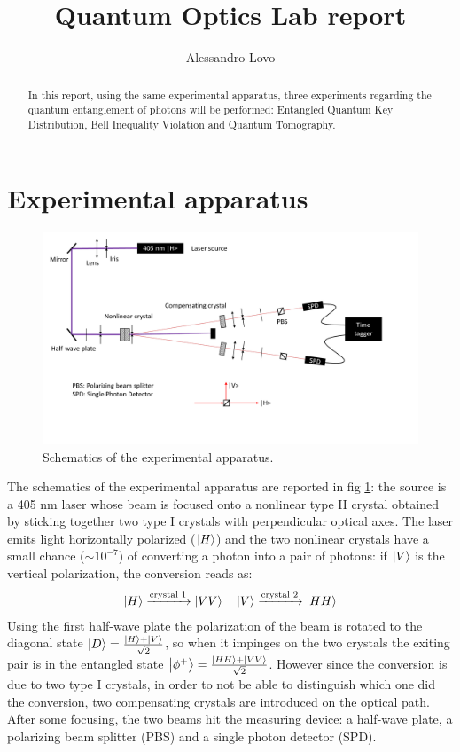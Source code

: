 \documentclass[a4paper, 11pt]{article}
\begin{document}
\title{Quantum Optics Lab report}
\author{Alessandro Lovo}

\maketitle

\begin{abstract}
  In this report, using the same experimental apparatus, three experiments regarding the quantum entanglement of photons will be performed: Entangled Quantum Key Distribution, Bell Inequality Violation and Quantum Tomography.
\end{abstract}


\section{Experimental apparatus}
  \begin{figure}[H]
    \includegraphics[width=1.0\textwidth]{img/apparatus.pdf}
    \caption{Schematics of the experimental apparatus.}
    \label{fig:apparatus}
  \end{figure}
  The schematics of the experimental apparatus are reported in fig \ref{fig:apparatus}: the source is a 405 \si{\nano\meter} laser whose beam is focused onto a nonlinear type II crystal obtained by sticking together two type I crystals with perpendicular optical axes. The laser emits light horizontally polarized ($\ket{H}$) and the two nonlinear crystals have a small chance ($\sim 10^{-7}$) of converting a photon into a pair of photons: if $\ket{V}$ is the vertical polarization, the conversion reads as:
  \begin{gather*}
    \ket{H} \xrightarrow[]{\text{crystal 1}} \ket{VV} \quad
    \ket{V} \xrightarrow[]{\text{crystal 2}} \ket{HH}
  \end{gather*}
  Using the first half-wave plate the polarization of the beam is rotated to the diagonal state $\ket{D} = \frac{\ket{H} + \ket{V}}{\sqrt{2}}$, so when it impinges on the two crystals the exiting pair is in the entangled state $\ket{\phi^+} = \frac{\ket{HH} + \ket{VV}}{\sqrt{2}}$. However since the conversion is due to two type I crystals, in order to not be able to distinguish which one did the conversion, two compensating crystals are introduced on the optical path. After some focusing, the two beams hit the measuring device: a half-wave plate, a polarizing beam splitter (PBS) and a single photon detector (SPD).
\end{document}
